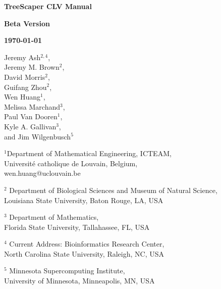 \documentclass[11pt]{article}
\begin{document}

\begin{titlepage} 

\centering
	{\huge\bfseries TreeScaper CLV Manual \par}
	\vspace{1cm}
	{\LARGE\bfseries Beta Version\par}
	\vspace{1cm}
	{\Large\bfseries \today\par}
	\vspace{1.5cm}
	{\Large Jeremy Ash$^{2,4}$, \\ Jeremy M. Brown$^{2}$, \\ David Morris$^{2}$, \\ Guifang Zhou$^{2}$, \\ Wen Huang$^{1}$, \\ Melissa Marchand$^{3}$, \\ Paul Van Dooren$^{1}$, \\ Kyle A. Gallivan$^{3}$, \\ and Jim Wilgenbusch$^{5}$\par}
	\vspace{3.5cm}
	{\small $^{1}$Department of Mathematical Engineering, ICTEAM, \\ Universit\'{e} catholique de Louvain, Belgium, \\ wen.huang@uclouvain.be \par}
	\vspace{0.5cm}
	{\small $^{2}$ Department of Biological Sciences and Museum of Natural Science, \\ Louisiana State University, Baton Rouge, LA, USA \par}
	\vspace{0.5cm}
	{\small $^{3}$ Department of Mathematics, \\ Florida State University, Tallahassee, FL, USA \par}
	\vspace{0.5cm}
	{\small $^{4}$ Current Address: Bioinformatics Research Center, \\ North Carolina State University, Raleigh, NC, USA \par}
	\vspace{0.5cm}
	{\small $^{5}$ Minnesota Supercomputing Institute, \\ University of Minnesota, Minneapolis, MN, USA \par}
	\vfill


	

\end{titlepage}
\end{document}
